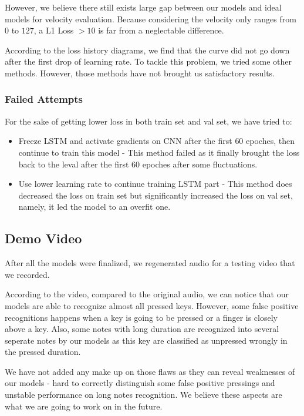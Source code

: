 \documentclass[10pt,twocolumn,letterpaper]{article}
\begin{document}
However, we believe there still exists large gap between our models and ideal models for velocity evaluation. Because considering the velocity only ranges from \(0\) to \(127\), a L1 Loss \(> 10\) is far from a neglectable difference.

According to the loss history diagrams, we find that the curve did not go down after the first drop of learning rate. To tackle this problem, we tried some other methods. However, those methods have not brought us satisfactory results.

\subsubsection{Failed Attempts}

For the sake of getting lower loss in both train set and val set, we have tried to:

\begin{itemize}

\item Freeze LSTM and activate gradients on CNN after the first \(60\) epoches, then continue to train this model - This method failed as it finally brought the loss back to the leval after the first \(60\) epoches after some fluctuations.

\item Use lower learning rate to continue training LSTM part - This method does decreased the loss on train set but significantly increased the loss on val set, namely, it led the model to an overfit one. 

\end{itemize}

\subsection{Demo Video}

After all the models were finalized, we regenerated audio for a testing video that we recorded.

According to the video, compared to the original audio, we can notice that our models are able to recognize almost all pressed keys. However, some false positive recognitions happens when a key is going to be pressed or a finger is closely above a key. Also, some notes with long duration are recognized into several seperate notes by our models as this key are classified as unpressed wrongly in the pressed duration.

We have not added any make up on those flaws as they can reveal weaknesses of our models - hard to correctly distinguish some false positive pressings and unstable performance on long notes recognition. We believe these aspects are what we are going to work on in the future.
\end{document}
